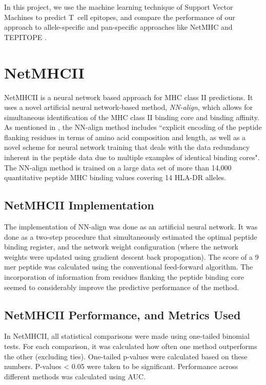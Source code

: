 \documentclass[journal]{IEEEtran}
\begin{document}
In this project, we use the machine learning technique of Support Vector Machines to predict T~cell epitopes, and compare the performance of our approach to allele-specific and pan-specific approaches like NetMHC and TEPITOPE \cite{TEPITOPE}. 


\section{NetMHCII}
NetMHCII is a neural network based approach for MHC class II predictions. It uses a novel artificial neural network-based method, \textit{NN-align}, which allows for simultaneous identification of the MHC class II binding core and binding affinity. As mentioned in \cite{NetMHCII}, the NN-align method includes ``explicit encoding of the peptide flanking residues in terms of amino acid composition and length, as well as a novel scheme for neural network training that deals with the data redundancy inherent in the peptide data due to multiple examples of identical binding cores". The NN-align method is trained on a large data set of more than 14,000 quantitative peptide MHC binding values covering 14 HLA-DR alleles.

\subsection{NetMHCII Implementation}
The implementation of NN-align was done as an artificial neural network. It was done as a two-step procedure that simultaneously estimated the optimal peptide binding register, and the network weight configuration (where the network weights were updated using gradient descent back propogation). The score of a 9 mer peptide was calculated using the conventional feed-forward algorithm. The incorporation of information from residues flanking the peptide binding core seemed to considerably improve the predictive performance of the method. 



\subsection{NetMHCII Performance, and Metrics Used}
In NetMHCII, all statistical comparisons were made using one-tailed binomial tests. For each comparison, it was calculated how often one method outperforms the other (excluding ties). One-tailed p-values were calculated based on these numbers. P-values < 0.05 were taken to be significant. Performance across different methods was calculated using AUC.
\end{document}
